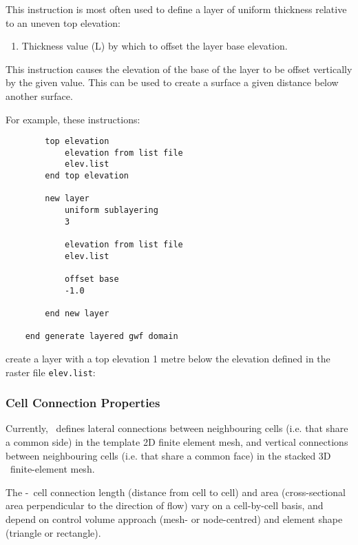 {This instruction is most often used to define a layer of uniform thickness relative to an uneven top elevation:

    {\squish
    \begin{enumerate}
    \item {} Thickness value (L) by which to offset the layer base elevation.
    \end{enumerate}
    This instruction causes the elevation of the base of the layer to be offset vertically by the given value.  This
    can be used to create a surface a given distance below another surface.
}

    For example, these instructions:
\begin{verbatim}
        top elevation
            elevation from list file
            elev.list
        end top elevation

        new layer
            uniform sublayering
            3

            elevation from list file
            elev.list

            offset base
            -1.0

        end new layer

    end generate layered gwf domain
\end{verbatim}
 create a layer with a top elevation 1 metre below the elevation defined in the raster file \texttt{elev.list}:


\subsubsection{Cell Connection Properties}
\label{section:GWFCellConnections}

Currently, \mut\ defines lateral connections between neighbouring cells (i.e. that share a common side) in the template 2D finite element mesh, and vertical connections between neighbouring cells (i.e. that share a common face) in the stacked 3D \gwf\ finite-element mesh.

The \gwf-\gwf\ cell connection length (distance from cell to cell) and area (cross-sectional area perpendicular to the direction of flow) vary on a cell-by-cell basis, and depend on control volume approach (mesh- or node-centred) and element shape (triangle or rectangle).

}
